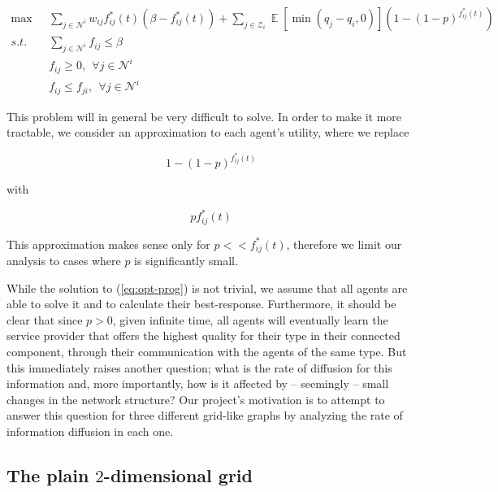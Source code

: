 \documentclass[A4paper,11pt]{article}
\newcommand{\Ex}{\mathop{\mathbb{E}}}
\begin{document}
\begin{align}\label{eq:opt-prog}
\max & \: \: \: \sum_{j \in \mathcal{N}^i} {w_{ij} f^*_{ij}(t) \left( \beta - f^*_{ij}(t) \right) } +
\sum_{j \in \mathcal{Z}_i} {\Ex \left[ \min \left( q_j - q_i, 0 \right) \right] \left( 1 - {\left( 1 - p \right)}^{f^*_{ij}(t)} \right) } \\
s.t. & \: \: \: \sum_{j \in \mathcal{N}^i} {f_{ij}} \leq \beta \nonumber \\
& \: \: \: f_{ij} \geq 0, \: \: \forall j \in \mathcal{N}^i \nonumber \\
& \: \: \: f_{ij} \leq f_{ji}, \: \: \forall j \in \mathcal{N}^i \nonumber
\end{align}

\par This problem will in general be very difficult to solve. In order to make it more tractable, we consider an approximation
to each agent's utility, where we replace

\[
1 - {\left( 1 - p \right)}^{f^*_{ij}(t)}
\]

with 

\[
p f^*_{ij}(t)
\]

This approximation makes sense only for $p << f^*_{ij}(t)$, therefore we limit our analysis to cases where $p$ is significantly
small.

\par While the solution to (\ref{eq:opt-prog}) is not trivial, we assume that all agents are able to solve it and to calculate
their best-response. Furthermore, it should be clear that since $p > 0$, given infinite time, all agents will eventually learn
the service provider that offers the highest quality for their type in their connected component, through their communication with
the agents of the same type. But this immediately raises another question; what is the rate of diffusion for this information and,
more importantly, how is it affected by -- seemingly -- small changes in the network structure? Our project's motivation is to
attempt to answer this question for three different grid-like graphs by analyzing the rate of information diffusion in each one.

\subsection{The plain $2$-dimensional grid}
\end{document}

